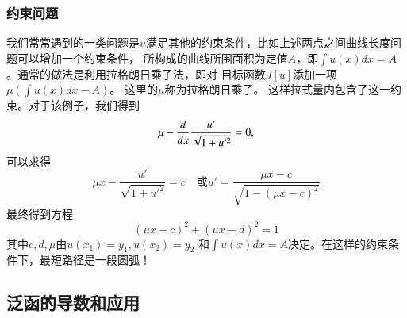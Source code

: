 \subsubsection{约束问题}
我们常常遇到的一类问题是$u$满足其他的约束条件，比如上述两点之间曲线长度问题可以增加一个约束条件，
所构成的曲线所围面积为定值$A$，即$\int u(x) dx = A$。通常的做法是利用拉格朗日乘子法，即对
目标函数$J[u]$添加一项$\mu\left( \int u(x) dx - A \right)$。 这里的$\mu$称为拉格朗日乘子。
这样拉式量内包含了这一约束。对于该例子，我们得到
\[
  \mu - \frac{d{}}{d{x}} \frac{u'}{\sqrt{1 + u'^2}} = 0,
\]
可以求得
\[
  \mu x-\frac{u'}{\sqrt{1+u'^2}}=c \quad \textrm{或} u'=\frac{\mu x-c}{\sqrt{1-(\mu x-c)^2}}
 \]
最终得到方程
\[
  (\mu x - c)^2 + (\mu x -d)^2 = 1
\]
其中$c,d,\mu$由$u(x_1)=y_1, u(x_2) = y_2$ 和$\int u(x) dx = A$决定。在这样的约束条件下，最短路径是一段圆弧！



\subsection{泛函的导数和应用}
\label{subsec:functional_applications}